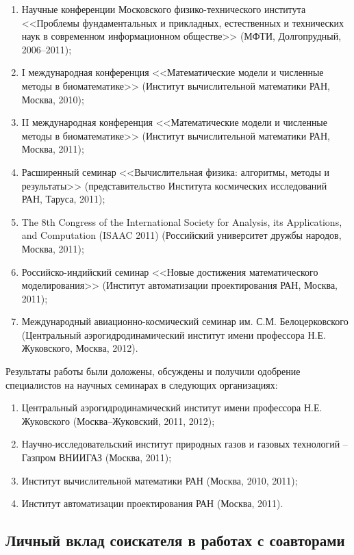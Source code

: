 \begin{enumerate}
\item Научные конференции Московского физико-технического института <<Проблемы фундаментальных и прикладных, естественных и технических наук в современном информационном обществе>> (МФТИ, Долгопрудный, 2006--2011);
\item I международная конференция <<Математические модели и численные методы в биоматематике>> (Институт вычислительной математики РАН, Москва, 2010);
\item II международная конференция <<Математические модели и численные методы в биоматематике>> (Институт вычислительной математики РАН, Москва, 2011);
\item Расширенный семинар <<Вычислительная физика: алгоритмы, методы и результаты>> (представительство Института космических исследований РАН, Таруса, 2011);
\item The 8th Congress of the International Society for Analysis, its Applications, and Computation (ISAAC 2011) (Российский университет дружбы народов, Москва, 2011);
\item Российско-индийский семинар <<Новые достижения математического моделирования>> (Институт автоматизации проектирования РАН, Москва, 2011);
\item Международный авиационно-космический семинар им. С.М. Белоцерковского (Центральный аэрогидродинамический институт имени профессора Н.Е. Жуковского, Москва, 2012).
\end{enumerate}

Результаты работы были доложены, обсуждены и получили одобрение специалистов на научных семинарах в следующих организациях:
\begin{enumerate}
\item Центральный аэрогидродинамический институт имени профессора Н.Е. Жуковского (Москва--Жуковский, 2011, 2012);
\item Научно-исследовательский институт природных газов и газовых технологий – Газпром ВНИИГАЗ (Москва, 2011);
\item Институт вычислительной математики РАН (Москва, 2010, 2011);
\item Институт автоматизации проектирования РАН (Москва, 2011).
\end{enumerate}


\subsection*{Личный вклад соискателя в работах с соавторами}


